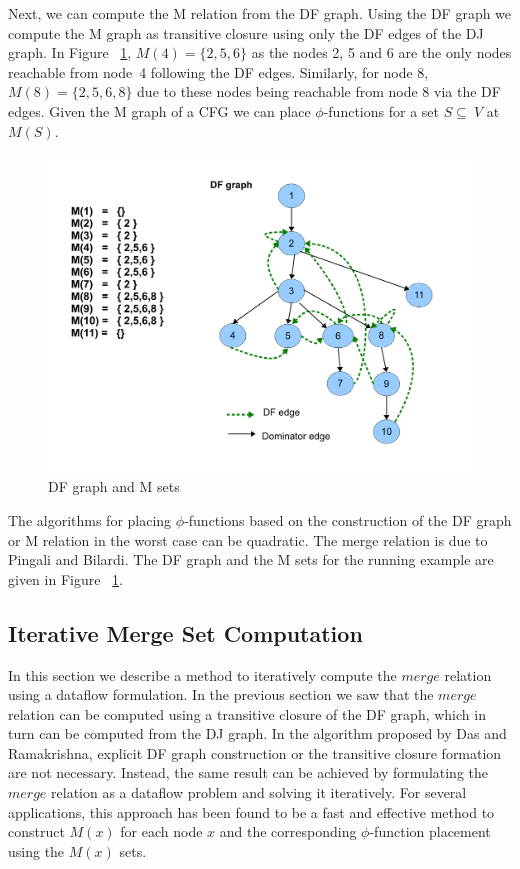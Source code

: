 {Next, we can compute the M relation from the DF graph. 
Using the DF graph we compute the M graph as transitive closure
using only the DF edges of the DJ graph. In Figure ~\ref{fig:mgraph}, $M(4) = \{2,5,6\}$ as the nodes 2, 5 and 6 are the only nodes reachable from node~4 following the DF edges. Similarly, for node 8, $M(8) = \{2,5,6,8\}$ due to these nodes being reachable from node 8 via the DF edges. Given the M graph of a CFG we can place $\phi$-functions for a set $S \subseteq \ V$ at $M(S)$.

    \begin{figure}[htb]
    \centerline{\includegraphics[scale=0.4]{mgraph_1.pdf}}
    \caption{DF graph and M sets}
    \label{fig:mgraph}
    \end{figure} 

The algorithms for placing $\phi$-functions based on the construction of the DF graph or M relation 
in the worst case can be quadratic. The merge relation is due to Pingali and Bilardi. The DF graph and the M sets for the running example are given in Figure ~\ref{fig:mgraph}.

\subsection{Iterative Merge Set Computation}
In this section we describe a method to iteratively compute the $merge$ relation using a dataflow formulation. In the previous section we saw that the $merge$ relation can be computed using a transitive closure of the DF graph, which in turn can be computed from the DJ graph. In the algorithm proposed by Das and Ramakrishna, explicit DF graph construction or the transitive closure formation are not necessary. Instead, the same result can be achieved by formulating the $merge$ relation as a dataflow problem and solving it iteratively. For several applications, this approach has been found to be a fast and effective method to construct $M(x)$ for each node $x$ and the corresponding $\phi$-function placement using the $M(x)$ sets. 

}
